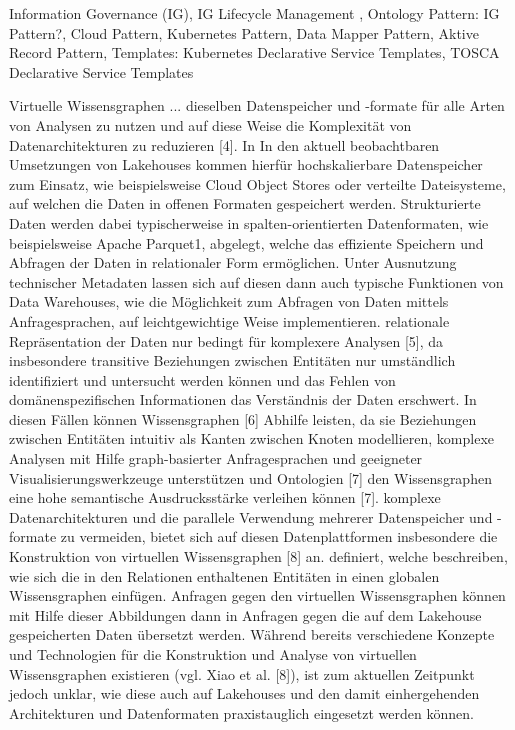 Information Governance (IG), IG Lifecycle Management , Ontology
Pattern: IG Pattern?, Cloud Pattern, Kubernetes Pattern, Data Mapper Pattern, Aktive Record Pattern,  
Templates: Kubernetes Declarative Service Templates, TOSCA Declarative Service Templates 

    Virtuelle Wissensgraphen 
    ... dieselben Datenspeicher und -formate für alle Arten von Analysen zu nutzen und auf diese Weise die Komplexität von Datenarchitekturen zu reduzieren [4]. In In den aktuell beobachtbaren Umsetzungen von Lakehouses kommen hierfür hochskalierbare Datenspeicher zum Einsatz, wie beispielsweise Cloud Object Stores oder verteilte Dateisysteme, auf welchen die Daten in offenen Formaten gespeichert werden. Strukturierte Daten werden dabei typischerweise in spalten-orientierten Datenformaten, wie beispielsweise Apache Parquet1, abgelegt, welche das effiziente Speichern und Abfragen der Daten in relationaler Form ermöglichen. Unter Ausnutzung technischer Metadaten lassen sich auf diesen dann auch typische Funktionen von Data Warehouses, wie die Möglichkeit zum Abfragen von Daten mittels Anfragesprachen, auf leichtgewichtige Weise implementieren.
    relationale Repräsentation der Daten nur bedingt für komplexere
    Analysen [5], da insbesondere transitive Beziehungen zwischen Entitäten nur umständlich identifiziert und untersucht werden können und das Fehlen von domänenspezifischen Informationen das Verständnis der Daten erschwert. In diesen Fällen können Wissensgraphen [6] Abhilfe leisten, da sie Beziehungen zwischen Entitäten intuitiv als Kanten zwischen Knoten modellieren, komplexe Analysen mit Hilfe graph-basierter Anfragesprachen und geeigneter Visualisierungswerkzeuge unterstützen und Ontologien [7] den Wissensgraphen eine hohe semantische Ausdrucksstärke verleihen können [7]. 
    komplexe Datenarchitekturen und die parallele Verwendung mehrerer Datenspeicher und -formate zu vermeiden, bietet sich auf diesen Datenplattformen insbesondere die Konstruktion von virtuellen Wissensgraphen [8] an.
    definiert, welche beschreiben, wie sich die in den Relationen enthaltenen Entitäten in einen
    globalen Wissensgraphen einfügen. Anfragen gegen den virtuellen Wissensgraphen können mit
    Hilfe dieser Abbildungen dann in Anfragen gegen die auf dem Lakehouse gespeicherten Daten
    übersetzt werden. Während bereits verschiedene Konzepte und Technologien für die Konstruktion und Analyse von virtuellen Wissensgraphen existieren (vgl. Xiao et al. [8]), ist zum aktuellen Zeitpunkt jedoch unklar, wie diese auch auf Lakehouses und den damit einhergehenden Architekturen und Datenformaten praxistauglich eingesetzt werden können.
    

